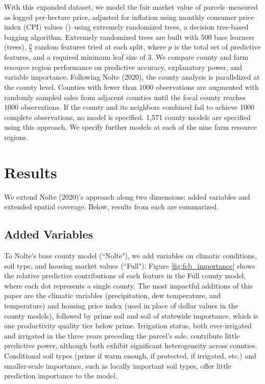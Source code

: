 \documentclass[12pt]{article}
\begin{document}
With this expanded dataset, we model the fair market value of parcels--measured as logged per-hectare price, adjusted for inflation using monthly consumer price index (CPI) values (\cite{blsConsumerPrice})--using extremely randomized trees, a decision tree-based bagging algorithm. Extremely randomized trees are built with 500 base learners (trees), $\frac{p}{3}$ random features tried at each split, where $p$ is the total set of predictive features, and a required minimum leaf size of 3. We compare county and farm resource region performance on predictive accuracy, explanatory power, and variable importance. Following Nolte (2020), the county analysis is parallelized at the county level. Counties with fewer than 1000 observations are augmented with randomly sampled sales from adjacent counties until the focal county reaches 1000 observations. If the county and its neighbors combined fail to achieve 1000 complete observations, no model is specified. 1,571 county models are specified using this approach. We specify further models at each of the nine farm resource regions. 

\newpage

\section{Results}

We extend Nolte (2020)'s approach along two dimensions: added variables and extended spatial coverage. Below, results from each are summarized.

\subsection{Added Variables}

To Nolte's base county model (``Nolte"), we add variables on climatic conditions, soil type, and housing market values (``Full"). Figure \ref{fig:fcb_importance} shows the relative predictive contributions of each feature in the Full county model, where each dot represents a single county. The most impactful additions of this paper are the climatic variables (precipitation, dew temperature, and temperature) and housing price index (used in place of dollar values in the county models), followed by prime soil and soil of statewide importance, which is one productivity quality tier below prime. Irrigation status, both ever-irrigated and irrigated in the three years preceding the parcel's sale, contribute little predictive power, although both exhibit significant heterogeneity across counties. Conditional soil types (prime if warm enough, if protected, if irrigated, etc.) and smaller-scale importance, such as locally important soil types, offer little prediction importance to the model.
\end{document}
